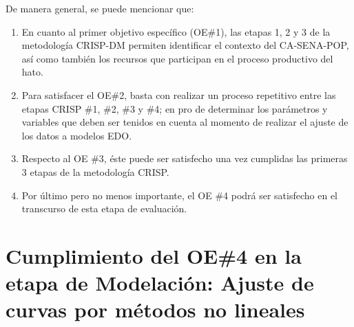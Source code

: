 De manera general, se puede mencionar que:
\begin{enumerate}
    \item En cuanto al primer objetivo específico (OE\#1), las etapas 1, 2 y 3 de la metodología CRISP-DM permiten identificar el contexto del CA-SENA-POP, así como también los recursos que participan en el proceso productivo del hato.
    \item Para satisfacer el OE\#2, basta con realizar un proceso repetitivo entre las etapas CRISP \#1, \#2, \#3 y \#4; en pro de determinar los parámetros y variables que deben ser tenidos en cuenta al momento de realizar el ajuste de los datos a modelos EDO.
    \item Respecto al OE \#3, éste puede ser satisfecho una vez cumplidas las primeras 3 etapas de la metodología CRISP.
    \item Por último pero no menos importante, el OE \#4 podrá ser satisfecho en el transcurso de esta etapa de evaluación.
\end{enumerate}




\section{Cumplimiento del OE\#4 en la etapa de Modelación: Ajuste de curvas por métodos no lineales}

\begin{table}[H]
\centering
\caption{Comparación de error cuadrático medio (MSE) para cada método de ajuste no lineal.}
\label{msecompare}
\end{table}
\pagebreak

